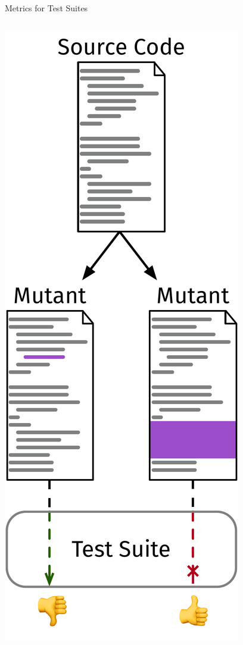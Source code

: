 \documentclass[aspectratio=169,dvipsnames]{beamer}
\begin{document}
\begin{frame}{Metrics for Test Suites}
\begin{columns}
\begin{column}{0.25\textwidth}
        \includegraphics[height=\textheight]{mutation_testing}
    \end{column}
  \end{columns}
\end{frame}
\end{document}
